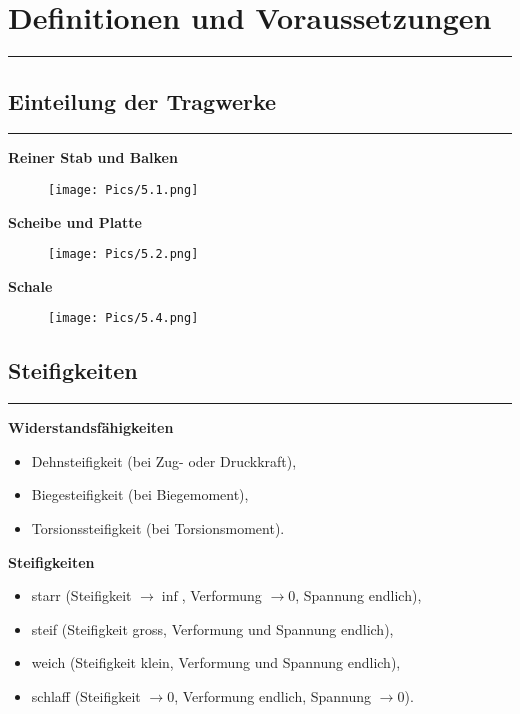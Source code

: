 \section{Definitionen und Voraussetzungen}
\noindent\rule[\linienAbstand]{\linewidth}{\linienDickeDick}

\subsection{Einteilung der Tragwerke}
\noindent\rule[\linienAbstand]{\linewidth}{\linienDicke}
\textbf{Reiner Stab und Balken}
\begin{figure}[H]
  \centering
  \texttt{[image: Pics/5.1.png]}
\end{figure}
\textbf{Scheibe und Platte}
\begin{figure}[H]
  \centering
  \texttt{[image: Pics/5.2.png]}
\end{figure}
\textbf{Schale}
\begin{figure}[H]
  \centering
  \texttt{[image: Pics/5.4.png]}
\end{figure}

\subsection{Steifigkeiten}
\noindent\rule[\linienAbstand]{\linewidth}{\linienDicke}
\textbf{Widerstandsfähigkeiten}
\begin{itemize}
  \item Dehnsteifigkeit (bei Zug- oder Druckkraft),
  \item Biegesteifigkeit (bei Biegemoment),
  \item Torsionssteifigkeit (bei Torsionsmoment).\\
\end{itemize}

\textbf{Steifigkeiten}
\begin{itemize}
  \item starr (Steifigkeit $\rightarrow  \inf$, Verformung $\rightarrow 0$, Spannung endlich),
  \item steif (Steifigkeit gross, Verformung und Spannung endlich),
  \item weich (Steifigkeit klein, Verformung und Spannung endlich),
  \item schlaff (Steifigkeit $\rightarrow 0$, Verformung endlich, Spannung $\rightarrow 0$).
\end{itemize}


